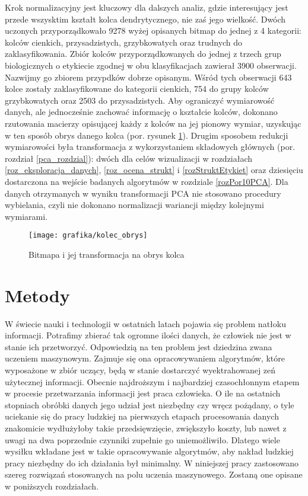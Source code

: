 \documentclass{article}
\begin{document}
Krok normalizacyjny jest kluczowy dla dalszych analiz, gdzie interesujący jest przede wszysktim kształt kolca dendrytycznego, nie zaś jego wielkość.
Dwóch uczonych przyporządkowało 9278 wyżej opisanych bitmap do jednej z 4 kategorii: kolców cienkich, przysadzistych, grzybkowatych oraz trudnych do zaklasyfikowania.
Zbiór kolców przyporządkowanych do jednej z trzech grup biologicznych o etykiecie zgodnej w obu klasyfikacjach zawierał 3900 obserwacji.
Nazwijmy go zbiorem przypdków dobrze opisanym.
Wśród tych obserwacji 643 kolce zostały zaklasyfikowane do kategorii cienkich, 754 do grupy kolców grzybkowatych oraz 2503 do przysadzistych.
Aby ograniczyć wymiarowość danych, ale jednocześnie zachować informację o kształcie kolców, dokonano rzutowania macierzy opisującej każdy z kolców na jej pionowy wymiar, uzyskując w ten sposób obrys danego kolca (por. rysunek \ref{rysKolecObrys}).
Drugim sposobem redukcji wymiarowości była transformacja z wykorzystaniem składowych głównych (por. rozdział \ref{pca_rozdzial}): dwóch dla celów wizualizacji w rozdziałach \ref{roz_eksploracja_danych}, \ref{roz_ocena_strukt} i \ref{rozStruktEtykiet} oraz dziesięciu dostarczona na wejście badanych algorytmów w rozdziale \ref{rozPor10PCA}.
Dla danych otrzymanych w wyniku transformacji PCA nie stosowano procedury wybielania, czyli nie dokonano normalizacji wariancji między kolejnymi wymiarami.

\begin{figure}
\caption{Bitmapa i jej transformacja na obrys kolca}
\label{rysKolecObrys}
\texttt{[image: grafika/kolec\_obrys]}
\end{figure}



\section{Metody}
W świecie nauki i technologii w ostatnich latach pojawia się problem natłoku informacji.
Potrafimy zbierać tak ogromne ilości danych, że człowiek nie jest w stanie ich przetworzyć.
Odpowiedzią na ten problem jest dziedzina zwana uczeniem maszynowym. 
Zajmuje się ona opracowywaniem algorytmów, które wyposażone w zbiór uczący, będą w stanie dostarczyć wyektrahowanej zeń użytecznej informacji.
Obecnie najdroższym i najbardziej czasochłonnym etapem w procesie przetwarzania informacji jest praca człowieka.
O ile na ostatnich stopniach obróbki danych jego udział jest niezbędny czy wręcz pożądany, o tyle uciekanie się do pracy ludzkiej na pierwszych etapach procesowania danych znakomicie wydłużyłoby takie przedsięwzięcie, zwiększyło koszty, lub nawet z uwagi na dwa poprzednie czynniki zupełnie go uniemożliwiło.
Dlatego wiele wysiłku wkładane jest w takie opracowywanie algorytmów, aby nakład ludzkiej pracy niezbędny do ich działania był minimalny.
W niniejszej pracy zastosowano szereg rozwiązań stosowanych na polu uczenia maszynowego.
Zostaną one opisane w poniższych rozdziałach.
\end{document}
